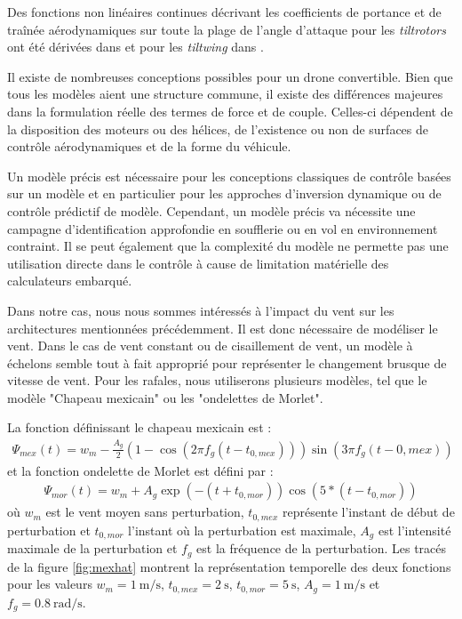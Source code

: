 Des fonctions non linéaires continues décrivant les coefficients de portance et de traînée aérodynamiques sur toute la plage de l'angle d'attaque pour les  \textit{tiltrotors} ont été dérivées dans \cite{6981467} et pour les \textit{tiltwing} dans \cite{lustosaHal-03035938,Lustosa2017LaP}.

Il existe de nombreuses conceptions possibles pour un drone convertible. Bien que tous les modèles aient une structure commune, il existe des différences majeures dans la formulation réelle des termes de force et de couple. Celles-ci dépendent de la disposition des moteurs ou des hélices, de l'existence ou non de surfaces de contrôle aérodynamiques et de la forme du véhicule.

Un modèle précis est nécessaire pour les conceptions classiques de contrôle basées sur un modèle et en particulier pour les approches d'inversion dynamique ou de contrôle prédictif de modèle. Cependant, un modèle précis va nécessite une campagne d'identification approfondie en soufflerie ou en vol en environnement contraint. Il se peut également que la complexité du modèle ne permette pas une utilisation directe dans le contrôle à cause de limitation matérielle des calculateurs embarqué.


Dans notre cas, nous nous sommes intéressés à l'impact du vent sur les architectures mentionnées précédemment. Il est donc nécessaire de modéliser le vent. Dans le cas de vent constant ou de cisaillement de vent, un modèle à échelons semble tout à fait approprié pour représenter le changement brusque de vitesse de vent. 
Pour les rafales, nous utiliserons plusieurs modèles, tel que le modèle "Chapeau mexicain" ou les "ondelettes de Morlet".

La fonction définissant le chapeau mexicain est :
\begin{align}
    \Psi_{mex}(t)= w_{m} - \frac{A_g}{2} \left(1-\cos(2 \pi f_g (t-t_{0,mex}))\right)\sin(3 \pi f_g (t-{0,mex}))
\end{align}
et la fonction ondelette de Morlet est défini par :
\begin{align}
    \Psi_{mor}(t)=  w_{m} + A_g \exp(-(t+t_{0,mor})) \cos(5*(t-t_{0,mor}))
\end{align}
où $w_{m}$ est le vent moyen sans perturbation, $t_{0,mex}$ représente l'instant de début de perturbation et $t_{0,mor}$ l'instant où la perturbation est maximale, $A_g$ est l'intensité maximale de la perturbation et  $f_g$ est la fréquence de la perturbation. Les tracés de la figure \ref{fig:mexhat} montrent la représentation temporelle des deux fonctions pour les valeurs $w_{m} = \SI{1}{\meter\per\second}$, $t_{0,mex} = \SI{2}{\second}$,  $t_{0,mor} = \SI{5}{\second}$, $A_g = \SI{1}{\meter\per\second}$ et $f_g = \SI{0.8}{\radian\per\second}$.


